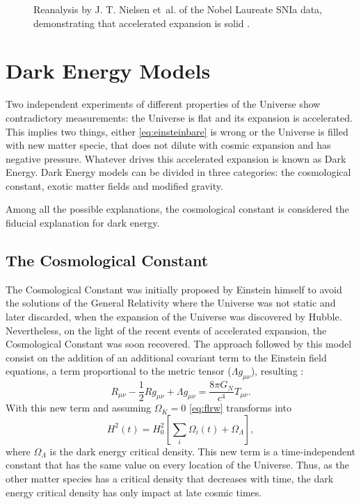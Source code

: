 \begin{figure}
\begin{center}
\caption{Reanalysis by J. T. Nielsen et~al. of the Nobel Laureate SNIa data, demonstrating that accelerated expansion is solid \cite{2016NatSR...635596N}.}
\label{fig:sarkar_SNIa}
\end{center}
\end{figure}

\section{Dark Energy Models}
Two independent experiments of different properties of the Universe show contradictory measurements: the Universe is flat and its expansion is accelerated. This implies two things, either \autoref{eq:einsteinbare} is wrong or the Universe is filled with new matter specie, that does not dilute with cosmic expansion and has negative pressure. Whatever drives this accelerated expansion is known as Dark Energy. Dark Energy models can be divided in three categories: the cosmological constant, exotic matter fields and modified gravity.
\newline

Among all the possible explanations, the cosmological constant is considered the fiducial explanation for dark energy.

\subsection{The Cosmological Constant}
The Cosmological Constant was initially proposed by Einstein himself \cite{1917SPAW.......142E} to avoid the solutions of the General Relativity where the Universe was not static and later discarded, when the expansion of the Universe was discovered by Hubble. Nevertheless, on the light of the recent events of accelerated expansion, the Cosmological Constant was soon recovered. The approach followed by this model consist on the addition of an additional covariant term to the Einstein field equations, a term proportional to the metric tensor ($\Lambda g_{\mu\nu}$), resulting \cite{2001LRR.....4....1C}:
\begin{equation}
R_{\mu\nu}-\frac{1}{2}Rg_{\mu\nu}+\Lambda g_{\mu\nu} = \frac{8\pi G_N}{c^4}T_{\mu\nu}.
\end{equation}
With this new term and assuming $\Omega_K=0$ \autoref{eq:flrw} transforms into
\begin{equation}
H^2(t) = H_0^2\left[\sum_i\Omega_i(t) +\Omega_\Lambda\right],
\end{equation}
where $\Omega_\Lambda$ is the dark energy critical density. This new term is a time-independent constant that has the same value on every location of the Universe. Thus, as the other matter species has a critical density that decreases with time, the dark energy critical density has only impact at late cosmic times.
\newline


